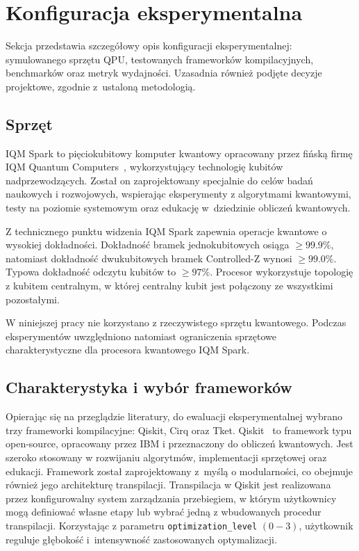\section{Konfiguracja eksperymentalna}
\label{sec:setup}

Sekcja przedstawia szczegółowy opis konfiguracji eksperymentalnej: symulowanego sprzętu QPU, testowanych frameworków kompilacyjnych, benchmarków oraz metryk wydajności. Uzasadnia również podjęte decyzje projektowe, zgodnie z~ustaloną metodologią.

\subsection{Sprzęt}
IQM Spark to pięciokubitowy komputer kwantowy opracowany przez fińską firmę IQM Quantum Computers~\cite{Rnkk2024}, wykorzystujący technologię kubitów nadprzewodzących. Został on zaprojektowany specjalnie do celów badań naukowych i rozwojowych, wspierając eksperymenty z algorytmami kwantowymi, testy na poziomie systemowym oraz edukację w~dziedzinie obliczeń kwantowych. 

Z technicznego punktu widzenia IQM Spark zapewnia operacje kwantowe o wysokiej dokładności. Dokładność bramek jednokubitowych osiąga $\geq99.9\%$, natomiast dokładność dwukubitowych bramek Controlled-Z wynosi $\geq99.0\%$. Typowa dokładność odczytu kubitów to $\geq97\%$. Procesor wykorzystuje topologię z kubitem centralnym, w której centralny kubit jest połączony ze wszystkimi pozostałymi.

W niniejszej pracy nie korzystano z rzeczywistego sprzętu kwantowego. Podczas eksperymentów uwzględniono natomiast ograniczenia sprzętowe charakterystyczne dla procesora kwantowego IQM Spark.

\subsection{Charakterystyka i wybór frameworków}

 Opierając się na przeglądzie literatury, do ewaluacji eksperymentalnej wybrano trzy frameworki kompilacyjne: Qiskit, Cirq oraz Tket. Qiskit~\cite{ibmqiskit2024} to framework typu open-source, opracowany przez IBM  i przeznaczony do obliczeń kwantowych. Jest szeroko stosowany w rozwijaniu algorytmów, implementacji sprzętowej oraz edukacji. Framework został zaprojektowany z~myślą o modularności, co obejmuje również jego architekturę transpilacji. Transpilacja w Qiskit jest realizowana przez konfigurowalny system zarządzania przebiegiem, w którym użytkownicy mogą definiować własne etapy lub wybrać jedną z wbudowanych procedur transpilacji. Korzystając z parametru \texttt{optimization\_level} $(0-3)$, użytkownik reguluje głębokość i~intensywność zastosowanych optymalizacji.

